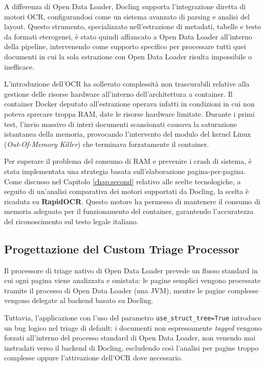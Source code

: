 A differenza di Open Data Loader, Docling supporta l'integrazione diretta di motori OCR, configurandosi come un sistema avanzato di parsing e analisi del layout. Questo strumento, specializzato nell'estrazione di metadati, tabelle e testo da formati eterogenei, è stato quindi affiancato a Open Data Loader all'interno della pipeline, intervenendo come supporto specifico per processare tutti quei documenti in cui la sola estrazione con Open Data Loader risulta impossibile o inefficace.

L'introduzione dell'OCR ha sollevato complessità non trascurabili relative alla gestione delle risorse hardware all'interno dell'architettura a container. Il container Docker deputato all'estrazione operava infatti in condizioni in cui non poteva sprecare troppa RAM, date le risorse hardware limitate. Durante i primi test, l'invio massivo di interi documenti scansionati causava la saturazione istantanea della memoria, provocando l'intervento del modulo del kernel Linux (\textit{Out-Of-Memory Killer}) che terminava forzatamente il container.

Per superare il problema del consumo di RAM e prevenire i crash di sistema, è stata implementata una strategia basata sull'elaborazione pagina-per-pagina. Come discusso nel Capitolo \ref{chap:second} relativo alle scelte tecnologiche, a seguito di un'analisi comparativa dei motori supportati da Docling, la scelta è ricaduta su \textbf{RapidOCR}. Questo motore ha permesso di mantenere il consumo di memoria adeguato per il funzionamento del container, garantendo l'accuratezza del riconoscimento sul testo legale italiano.

\subsection{Progettazione del Custom Triage Processor}
Il processore di triage nativo di Open Data Loader prevede un flusso standard in cui ogni pagina viene analizzata e smistata: le pagine semplici vengono processate tramite il processo di Open Data Loader (una JVM), mentre le pagine complesse vengono delegate al backend basato su Docling. 

Tuttavia, l'applicazione con l'uso del parametro \texttt{use\_struct\_tree=True} introduce un bug logico nel triage di default: i documenti non espressamente \textit{tagged} vengono forzati all'interno del processo standard di Open Data Loader, non venendo mai instradati verso il backend di Docling, escludendo così l'analisi per pagine troppo complesse oppure l'attivazione dell'OCR dove necessario.

